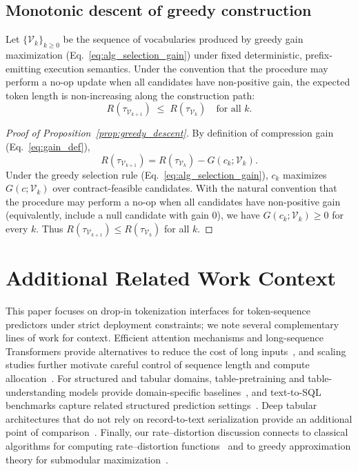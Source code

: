 \subsection{Monotonic descent of greedy construction}
\label{app:greedy_descent}

\begin{proposition}
\label{prop:greedy_descent}
Let $\{\mathcal{V}_k\}_{k \ge 0}$ be the sequence of vocabularies produced by greedy gain maximization
(Eq.~\eqref{eq:alg_selection_gain}) under fixed deterministic, prefix-emitting execution semantics.
Under the convention that the procedure may perform a no-op update when all candidates have non-positive gain, the expected token length is non-increasing along the construction path:
\[
R(\tau_{\mathcal{V}_{k+1}})
\;\le\;
R(\tau_{\mathcal{V}_{k}})
\quad \text{for all } k.
\]
\end{proposition}

\begin{proof}[Proof of Proposition~\ref{prop:greedy_descent}]
By definition of compression gain (Eq.~\eqref{eq:gain_def}),
\[
R(\tau_{\mathcal{V}_{k+1}})
=
R(\tau_{\mathcal{V}_k}) - G(c_k;\mathcal{V}_k).
\]
Under the greedy selection rule (Eq.~\eqref{eq:alg_selection_gain}), $c_k$ maximizes $G(c;\mathcal{V}_k)$ over
contract-feasible candidates.
With the natural convention that the procedure may perform a no-op when all candidates have non-positive gain (equivalently, include a null candidate with gain $0$), we have $G(c_k;\mathcal{V}_k)\ge 0$ for every $k$.
Thus $R(\tau_{\mathcal{V}_{k+1}})\le R(\tau_{\mathcal{V}_k})$ for all $k$.
\end{proof}

\section{Additional Related Work Context}
\label{sec:appendix_related_work}

This paper focuses on drop-in tokenization interfaces for token-sequence predictors under strict deployment constraints; we note several complementary lines of work for context.
Efficient attention mechanisms and long-sequence Transformers provide alternatives to reduce the cost of long inputs~\cite{beltagy2020longformer,zaheer2020bigbird,guo2019star}, and scaling studies further motivate careful control of sequence length and compute allocation~\cite{kaplan2020scaling,zhai2022scaling}.
For structured and tabular domains, table-pretraining and table-understanding models provide domain-specific baselines~\cite{wang2021tuta,deng2022turl}, and text-to-SQL benchmarks capture related structured prediction settings~\cite{zhong2017seq2sql,yu2018spider}.
Deep tabular architectures that do not rely on record-to-text serialization provide an additional point of comparison~\cite{huang2020tabtransformer,gorishniy2021revisiting}.
Finally, our rate--distortion discussion connects to classical algorithms for computing rate--distortion functions~\cite{blahut2003computation,arimoto1972algorithm} and to greedy approximation theory for submodular maximization~\cite{nemhauser1978analysis}.
